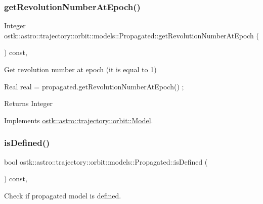 \subsubsection{\texorpdfstring{get\+Revolution\+Number\+At\+Epoch()}{getRevolutionNumberAtEpoch()}}
{\footnotesize\ttfamily Integer ostk\+::astro\+::trajectory\+::orbit\+::models\+::\+Propagated\+::get\+Revolution\+Number\+At\+Epoch (\begin{DoxyParamCaption}{ }\end{DoxyParamCaption}) const\hspace{0.3cm}{\ttfamily [override]}, {\ttfamily [virtual]}}



Get revolution number at epoch (it is equal to 1) 


\begin{DoxyCode}
Real real = propagated.getRevolutionNumberAtEpoch() ;
\end{DoxyCode}


\begin{DoxyReturn}{Returns}
Integer 
\end{DoxyReturn}


Implements \hyperlink{classostk_1_1astro_1_1trajectory_1_1orbit_1_1_model_af3f1866f86045da2c05efe4165735cf4}{ostk\+::astro\+::trajectory\+::orbit\+::\+Model}.

\mbox{\label{classostk_1_1astro_1_1trajectory_1_1orbit_1_1models_1_1_propagated_a530fd6bc017c74dedc43ced5fe843a03}} 
\subsubsection{\texorpdfstring{is\+Defined()}{isDefined()}}
{\footnotesize\ttfamily bool ostk\+::astro\+::trajectory\+::orbit\+::models\+::\+Propagated\+::is\+Defined (\begin{DoxyParamCaption}{ }\end{DoxyParamCaption}) const\hspace{0.3cm}{\ttfamily [override]}, {\ttfamily [virtual]}}



Check if propagated model is defined. 


